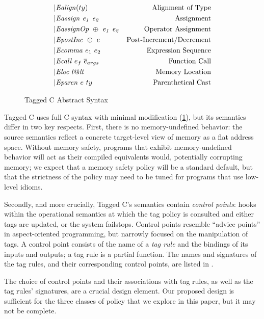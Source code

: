 \documentclass[acmsmall,review,anonymous]{acmart}\settopmatter{printfolios=true,printccs=false,printacmref=false}
\begin{document}
\begin{figure}
\begin{subfigure}[t]{0.69\textwidth}
\[\begin{aligned}
    | & \mathit{Ealign}(ty) & \textnormal{Alignment of Type} \\
    | & \mathit{Eassign ~ e_1 ~ e_2} & \textnormal{Assignment} \\
    | & \mathit{EassignOp ~ \oplus ~ e_1 ~ e_2} & \textnormal{Operator Assignment} \\
    | & \mathit{EpostInc} ~ \oplus ~ e & \textnormal{Post-Increment/Decrement} \\
    | & \mathit{Ecomma} ~ e_1 ~ e_2 & \textnormal{Expression Sequence} \\
    | & \mathit{Ecall} ~ e_f ~ \overline{e}_{args} & \textnormal{Function Call} \\
    | & \mathit{Eloc} ~ l@\mathit{lt} & \textnormal{Memory Location} \\
    | & \mathit{Eparen} ~ e ~ ty & \textnormal{Parenthetical Cast} \\
    \end{aligned}\]
  \end{subfigure}
  \caption{Tagged C Abstract Syntax}
  \label{fig:syntax}
\end{figure}

Tagged C uses full C syntax with minimal modification (\cref{fig:syntax}), but its semantics differ in
two key respects. First, there is no memory-undefined behavior: the source semantics reflect a
concrete target-level view of memory as a flat address space. Without memory safety, programs
that exhibit memory-undefined behavior will act as their compiled equivalents would, potentially
corrupting memory; we expect that a memory safety policy will be a standard default, but that the
strictness of the policy may need to be tuned for programs that use low-level idioms.

Secondly, and more crucially, Tagged C's semantics contain {\em control points}: hooks within the
operational semantics at which the tag policy is consulted and either tags are updated, or the system
failstops. Control points resemble ``advice points'' in aspect-oriented programming, but narrowly
focused on the manipulation of tags. A control point consists of the name of a {\em tag rule}
and the bindings of its inputs and outputs; a tag rule is a partial function. The names and
signatures of the tag rules, and their corresponding control points, are listed in .

The choice of control points and their associations with tag rules, as well as the tag rules'
signatures, are a crucial design element. Our proposed design is sufficient for the three classes of
policy that we explore in this paper, but it may not be complete.
\end{document}
